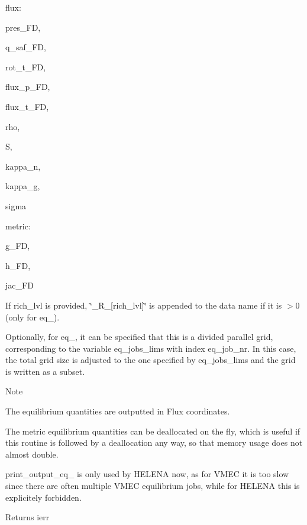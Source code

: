 \begin{DoxyItemize}
\item flux\+:
\begin{DoxyItemize}
\item {\ttfamily pres\+\_\+\+FD},
\item {\ttfamily q\+\_\+saf\+\_\+\+FD},
\item {\ttfamily rot\+\_\+t\+\_\+\+FD},
\item {\ttfamily flux\+\_\+p\+\_\+\+FD},
\item {\ttfamily flux\+\_\+t\+\_\+\+FD},
\item {\ttfamily rho},
\item {\ttfamily S},
\item {\ttfamily kappa\+\_\+n},
\item {\ttfamily kappa\+\_\+g},
\item {\ttfamily sigma} 
\end{DoxyItemize}
\item metric\+:
\begin{DoxyItemize}
\item {\ttfamily g\+\_\+\+FD},
\item {\ttfamily h\+\_\+\+FD},
\item {\ttfamily jac\+\_\+\+FD} 
\end{DoxyItemize}
\end{DoxyItemize}

If {\ttfamily rich\+\_\+lvl} is provided, {\ttfamily \char`\"{}\+\_\+\+R\+\_\+\mbox{[}rich\+\_\+lvl\mbox{]}\char`\"{}} is appended to the data name if it is {\ttfamily $>$0} (only for {\ttfamily eq\+\_}).

Optionally, for {\ttfamily eq\+\_}, it can be specified that this is a divided parallel grid, corresponding to the variable {\ttfamily eq\+\_\+jobs\+\_\+lims} with index {\ttfamily eq\+\_\+job\+\_\+nr}. In this case, the total grid size is adjusted to the one specified by {\ttfamily eq\+\_\+jobs\+\_\+lims} and the grid is written as a subset. \begin{DoxyNote}{Note}

\begin{DoxyEnumerate}
\item The equilibrium quantities are outputted in Flux coordinates.
\item The metric equilibrium quantities can be deallocated on the fly, which is useful if this routine is followed by a deallocation any way, so that memory usage does not almost double.
\item {\ttfamily print\+\_\+output\+\_\+eq\+\_} is only used by H\+E\+L\+E\+NA now, as for V\+M\+EC it is too slow since there are often multiple V\+M\+EC equilibrium jobs, while for H\+E\+L\+E\+NA this is explicitely forbidden.
\end{DoxyEnumerate}
\end{DoxyNote}
\begin{DoxyReturn}{Returns}
ierr 
\end{DoxyReturn}


